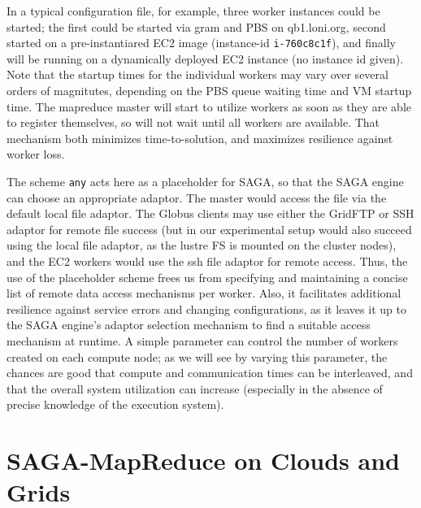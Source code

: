 \documentclass[conference,final]{IEEEtran}
\newcommand{\T}[1]{\texttt{#1}}
\begin{document}
  

In a typical configuration file, for example, three worker instances
could be started; the first could be started via gram and PBS on
qb1.loni.org, second started on a pre-instantiared EC2 image
(instance-id \T{i-760c8c1f}), and finally will be running on a
dynamically deployed EC2 instance (no instance id given).  Note that
the startup times for the individual workers may vary over several
orders of magnitutes, depending on the PBS queue waiting time and VM
startup time.  The mapreduce master will start to utilize workers as
soon as they are able to register themselves, so will not wait until
all workers are available.  That mechanism both minimizes
time-to-solution, and maximizes resilience against worker loss.

The scheme \T{any} acts here as a placeholder for SAGA, so that the
SAGA engine can choose an appropriate adaptor.  The master would
access the file via the default local file adaptor.  The Globus
clients may use either the GridFTP or SSH adaptor for remote file
success (but in our experimental setup would also succeed 
using the local file adaptor, as the lustre FS is mounted on the
cluster nodes), and the EC2 workers would use the ssh file adaptor for
remote access.  Thus, the use of the placeholder scheme frees us from
specifying and maintaining a concise list of remote data access
mechanisms per worker.  Also, it facilitates additional resilience
against service errors and changing configurations, as it leaves it up
to the SAGA engine's adaptor selection mechanism to find a suitable
access mechanism at runtime.
A simple parameter can control the number of workers created on each
compute node; as we will see by varying this parameter, the chances
are good that compute and communication times can be interleaved, and
that the overall system utilization can increase (especially in the
absence of precise knowledge of the execution system).
 
\section{SAGA-MapReduce on Clouds and Grids}
\end{document}
